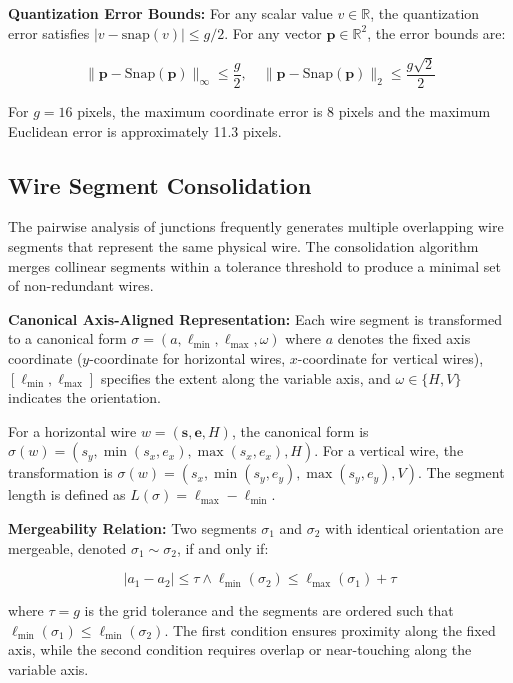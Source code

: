 \textbf{Quantization Error Bounds:} For any scalar value $v \in \mathbb{R}$, the quantization error satisfies $|v - \text{snap}(v)| \le g/2$. For any vector $\mathbf{p} \in \mathbb{R}^2$, the error bounds are:

\begin{equation}
\|\mathbf{p} - \text{Snap}(\mathbf{p})\|_\infty \le \frac{g}{2}, \quad \|\mathbf{p} - \text{Snap}(\mathbf{p})\|_2 \le \frac{g\sqrt{2}}{2}
\label{eq:quantization-error}
\end{equation}

For $g = 16$ pixels, the maximum coordinate error is 8 pixels and the maximum Euclidean error is approximately 11.3 pixels.

\subsection{Wire Segment Consolidation}

The pairwise analysis of junctions frequently generates multiple overlapping wire segments that represent the same physical wire. The consolidation algorithm merges collinear segments within a tolerance threshold to produce a minimal set of non-redundant wires.

\textbf{Canonical Axis-Aligned Representation:} Each wire segment is transformed to a canonical form $\sigma = (a, \ell_{\min}, \ell_{\max}, \omega)$ where $a$ denotes the fixed axis coordinate ($y$-coordinate for horizontal wires, $x$-coordinate for vertical wires), $[\ell_{\min}, \ell_{\max}]$ specifies the extent along the variable axis, and $\omega \in \{H, V\}$ indicates the orientation.

For a horizontal wire $w = (\mathbf{s}, \mathbf{e}, H)$, the canonical form is $\sigma(w) = (s_y, \min(s_x, e_x), \max(s_x, e_x), H)$. For a vertical wire, the transformation is $\sigma(w) = (s_x, \min(s_y, e_y), \max(s_y, e_y), V)$. The segment length is defined as $L(\sigma) = \ell_{\max} - \ell_{\min}$.

\textbf{Mergeability Relation:} Two segments $\sigma_1$ and $\sigma_2$ with identical orientation are mergeable, denoted $\sigma_1 \sim \sigma_2$, if and only if:

\begin{equation}
|a_1 - a_2| \le \tau \land \ell_{\min}(\sigma_2) \le \ell_{\max}(\sigma_1) + \tau
\label{eq:mergeability}
\end{equation}

where $\tau = g$ is the grid tolerance and the segments are ordered such that $\ell_{\min}(\sigma_1) \le \ell_{\min}(\sigma_2)$. The first condition ensures proximity along the fixed axis, while the second condition requires overlap or near-touching along the variable axis.

